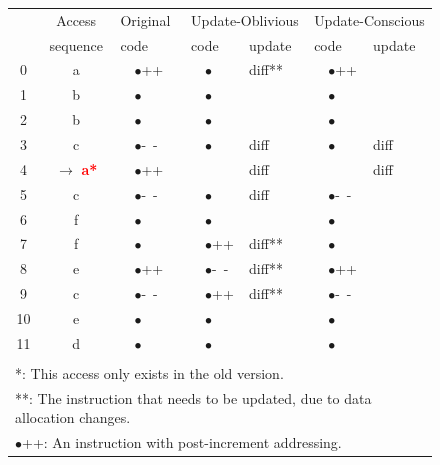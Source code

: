 \begin{figure}[htbp]
\begin{small}
\begin{center}
\begin{tabular}{|c|c||l||l|l||l|l|} \hline\hline
    & Access   & Original      & \multicolumn{2}{l||}{Update-Oblivious} & \multicolumn{2}{l|}{Update-Conscious} \\ \cline{4-7}
    & sequence & code         & code        & update & code         & update \\ \hline \hline
 0  & a        & ~~$\bullet$++  & ~~$\bullet$   & diff**   & ~~$\bullet$++  &        \\ 
 1  & b        & ~~$\bullet$    & ~~$\bullet$   &        & ~~$\bullet$    &        \\
 2  & b        & ~~$\bullet$    & ~~$\bullet$   &        & ~~$\bullet$    &        \\
 3  & c        & ~~$\bullet$-~- & ~~$\bullet$   & diff   & ~~$\bullet$    & diff   \\
 4  & $\rightarrow$ \textcolor{red}{\bf{a*}}
               & ~~$\bullet$++  &               & diff   &                & diff   \\
 5  & c        & ~~$\bullet$-~- & ~~$\bullet$   & diff   & ~~$\bullet$-~- &        \\
 6  & f        & ~~$\bullet$    & ~~$\bullet$   &        & ~~$\bullet$    &        \\
 7  & f        & ~~$\bullet$    & ~~$\bullet$++ & diff**   & ~~$\bullet$    &        \\
 8  & e        & ~~$\bullet$++  & ~~$\bullet$-~-& diff**   & ~~$\bullet$++  &        \\
 9  & c        & ~~$\bullet$-~- & ~~$\bullet$++ & diff**   & ~~$\bullet$-~- &        \\
 10 & e        & ~~$\bullet$    & ~~$\bullet$   &        & ~~$\bullet$    &        \\
 11 & d        & ~~$\bullet$    & ~~$\bullet$   &        & ~~$\bullet$    &        \\ \hline 
\multicolumn{7}{l}{ } \\
\multicolumn{7}{l}{*: This access only exists in the old version.}\\
\multicolumn{7}{l}{**: The instruction that needs to be updated, due to data allocation changes.}\\
\multicolumn{7}{l}{$\bullet$++: An instruction with post-increment addressing.}\\

\end{tabular}
\end{center}
\end{small}
\end{figure}

